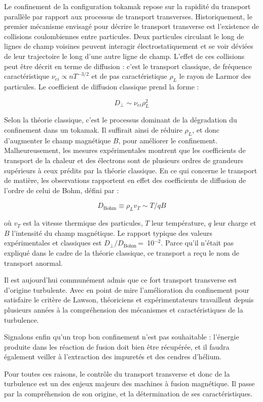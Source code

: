 \begin{refsection}
Le confinement de la configuration tokamak repose sur la rapidité du transport
parallèle par rapport aux processus de transport transverses. Historiquement, le
premier mécanisme envisagé pour décrire le transport transverse est l'existence
de collisions coulombiennes entre particules. Deux particules circulant le long
de lignes de champ voisines peuvent interagir électrostatiquement  et se voir
déviées de leur trajectoire le long d'une autre ligne de champ. L'effet de ces
collisions peut être décrit en terme de diffusion : c'est le transport
classique, de fréquence caractéristique $\nu_{ei}\propto nT^{-3/2}$ et de pas
caractéristique $\rho_{L}$ le rayon de Larmor des particules. Le coefficient de
diffusion classique prend la forme :

\begin{equation}
D_\perp\sim\nu_{ei}\rho_{L}^2
\end{equation}

Selon la théorie classique, c'est le processus dominant de la dégradation du
confinement dans un tokamak. Il suffirait ainsi de réduire $\rho_L$, et donc
d'augmenter le champ magnétique $B$, pour améliorer le confinement.
Malheureusement, les mesures expérimentales montrent que les coefficients de
transport de la chaleur et des électrons sont de plusieurs ordres de grandeurs
supérieurs à ceux prédits par la théorie classique. En ce qui concerne le
transport de matière, les observations rapportent en effet des coefficients de
diffusion de l'ordre de celui de Bohm, défini par :

\begin{equation}
D_\text{Bohm} \equiv \rho_L v_{T} \sim T/qB
\end{equation}

où $v_{T}$ est la vitesse thermique des particules, $T$ leur température, $q$
leur charge et $B$ l'intensité du champ magnétique. Le rapport typique des
valeurs expérimentales et classiques est $D_\perp/D_\text{Bohm}\,$=~10$^{-2}$.
Parce qu'il n'était pas expliqué dans le cadre de la théorie classique, ce
transport a reçu le nom de transport anormal.

Il est aujourd'hui communément admis que ce fort transport transverse est
d'origine turbulente. Avec en point de mire l'amélioration du confinement pour
satisfaire le critère de Lawson, théoriciens et expérimentateurs travaillent
depuis plusieurs années à la compréhension des mécanismes et
caractéristiques de la turbulence.

Signalons enfin qu'un trop bon confinement n'est pas souhaitable : l'énergie
produite dans les réaction de fusion doit bien être récupérée, et il faudra
également veiller à l'extraction des impuretés et des cendres d'hélium.

Pour toutes ces raisons, le contrôle du transport transverse et donc de la
turbulence est un des enjeux majeurs des machines à fusion magnétique. Il passe
par la compréhension de son origine, et la détermination de ses
caractéristiques.
\end{refsection}

